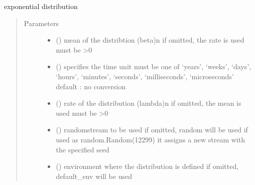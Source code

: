 \documentclass[letterpaper,10pt,english]{sphinxmanual}
\begin{document}
\begin{fulllineitems}
\label{\detokenize{Reference:salabim.Exponential}}
exponential distribution
\begin{quote}\begin{description}
\item[{Parameters}] \leavevmode\begin{itemize}
\item {} 
 () \textendash{} mean of the distribtion (beta)\textbar{}n\textbar{}
if omitted, the rate is used 
must be \textgreater{}0

\item {} 
 () \textendash{} specifies the time unit 
must be one of ‘years’, ‘weeks’, ‘days’, ‘hours’, ‘minutes’, ‘seconds’, ‘milliseconds’, ‘microseconds’ 
default : no conversion 

\item {} 
 () \textendash{} rate of the distribution (lambda)\textbar{}n\textbar{}
if omitted, the mean is used 
must be \textgreater{}0

\item {} 
 () \textendash{} randomstream to be used 
if omitted, random will be used 
if used as random.Random(12299)
it assigns a new stream with the specified seed

\item {} 
 ({\hyperref[\detokenize{Reference:salabim.Environment}]{}}) \textendash{} environment where the distribution is defined 
if omitted, default\_env will be used

\end{itemize}

\end{description}\end{quote}


\end{fulllineitems}
\end{document}
